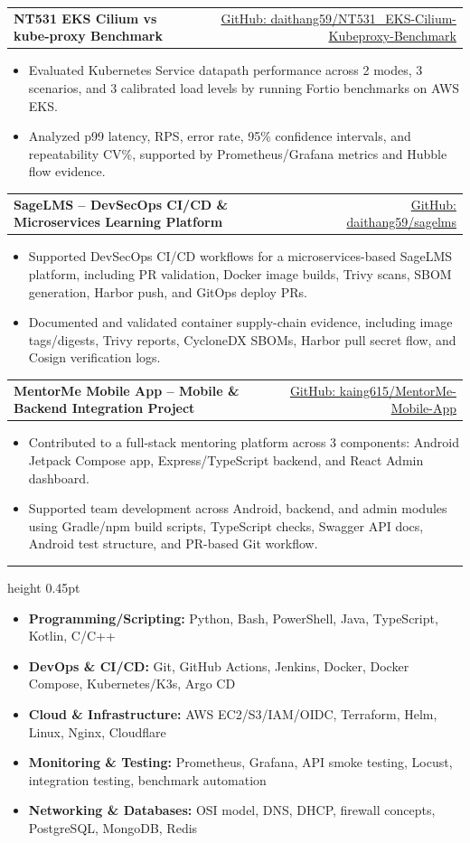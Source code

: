 \documentclass[10pt,a4paper]{article}
\makeatletter
\newcommand{\sectionTitle}[1]{%
  \vspace{8pt}
  \par\noindent{\normalsize\bfseries\textcolor{accent}{\MakeUppercase{#1}}}\par
  \vspace{3pt}
  \hrule height 0.45pt
  \vspace{4.5pt}
}
\newcommand{\resumeProject}[3]{%
  \vspace{3.5pt}
  \begin{tabularx}{\textwidth}{@{}>{\raggedright\arraybackslash}X@{\hspace{1.2em}}r@{}}
    \textbf{#1} & #2 \\
  \end{tabularx}
  \vspace{-0.55em}
  #3
}
\makeatother
\begin{document}
\resumeProject{NT531 EKS Cilium vs kube-proxy Benchmark}{\footnotesize\href{https://github.com/daithang59/NT531_EKS-Cilium-Kubeproxy-Benchmark}{GitHub: daithang59/NT531\_EKS-Cilium-Kubeproxy-Benchmark}}{
\begin{itemize}
  \item Evaluated Kubernetes Service datapath performance across 2 modes, 3 scenarios, and 3 calibrated load levels by running Fortio benchmarks on AWS EKS.
  \item Analyzed p99 latency, RPS, error rate, 95\% confidence intervals, and repeatability CV\%, supported by Prometheus/Grafana metrics and Hubble flow evidence.
\end{itemize}
}

\resumeProject{SageLMS -- DevSecOps CI/CD \& Microservices Learning Platform}{\footnotesize\href{https://github.com/daithang59/sagelms}{GitHub: daithang59/sagelms}}{
\begin{itemize}
  \item Supported DevSecOps CI/CD workflows for a microservices-based SageLMS platform, including PR validation, Docker image builds, Trivy scans, SBOM generation, Harbor push, and GitOps deploy PRs.
  \item Documented and validated container supply-chain evidence, including image tags/digests, Trivy reports, CycloneDX SBOMs, Harbor pull secret flow, and Cosign verification logs.
\end{itemize}
}

\resumeProject{MentorMe Mobile App -- Mobile \& Backend Integration Project}{\footnotesize\href{https://github.com/kaing615/MentorMe-Mobile-App}{GitHub: kaing615/MentorMe-Mobile-App}}{
\begin{itemize}
  \item Contributed to a full-stack mentoring platform across 3 components: Android Jetpack Compose app, Express/TypeScript backend, and React Admin dashboard.
  \item Supported team development across Android, backend, and admin modules using Gradle/npm build scripts, TypeScript checks, Swagger API docs, Android test structure, and PR-based Git workflow.
\end{itemize}
}

\sectionTitle{Technical Skills}
\begin{itemize}
  \item \textbf{Programming/Scripting:} Python, Bash, PowerShell, Java, TypeScript, Kotlin, C/C++
  \item \textbf{DevOps \& CI/CD:} Git, GitHub Actions, Jenkins, Docker, Docker Compose, Kubernetes/K3s, Argo CD
  \item \textbf{Cloud \& Infrastructure:} AWS EC2/S3/IAM/OIDC, Terraform, Helm, Linux, Nginx, Cloudflare
  \item \textbf{Monitoring \& Testing:} Prometheus, Grafana, API smoke testing, Locust, integration testing, benchmark automation
  \item \textbf{Networking \& Databases:} OSI model, DNS, DHCP, firewall concepts, PostgreSQL, MongoDB, Redis
\end{itemize}
\end{document}
